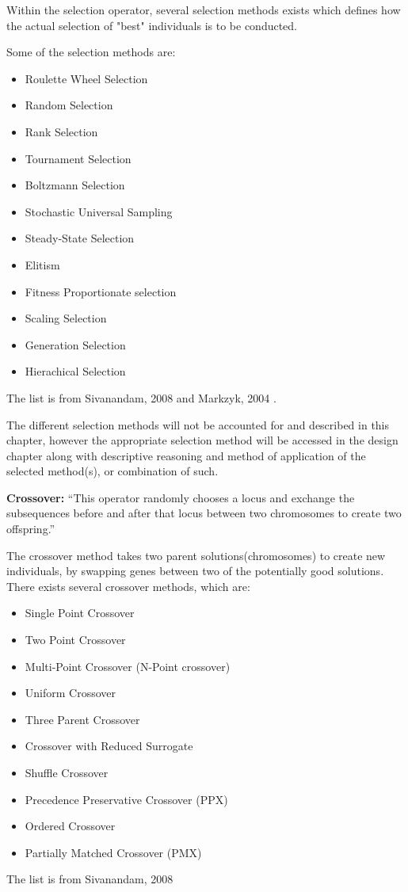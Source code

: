 \begin{itemize}
Within the selection operator, several selection methods exists which defines how the actual selection of "best" individuals is to be conducted. 

Some of the selection methods are:
\begin{itemize}
\item Roulette Wheel Selection
\item Random Selection
\item Rank Selection
\item Tournament Selection
\item Boltzmann Selection
\item Stochastic Universal Sampling
\item Steady-State Selection
\item Elitism
\item Fitness Proportionate selection
\item Scaling Selection
\item Generation Selection
\item Hierachical Selection
\end{itemize}
The list is from Sivanandam, 2008 \cite[pp. 46-50]{Sivanandam2008} and Markzyk, 2004 \cite{Adam2004}.

The different selection methods will not be accounted for and described in this chapter, however the appropriate selection method will be accessed in the design chapter along with descriptive reasoning and method of application of the selected method(s), or combination of such.

\textbf{Crossover:} \enquote{This operator randomly chooses a locus and exchange the subsequences before and after that locus between two chromosomes to create two offspring.} \cite[pp. 8]{Melanie1990}

The crossover method takes two parent solutions(chromosomes) to create new individuals, by swapping genes between two of the potentially good solutions. There exists several crossover methods, which are:


\begin{itemize}
\item Single Point Crossover
\item Two Point Crossover
\item Multi-Point Crossover (N-Point crossover)
\item Uniform Crossover
\item Three Parent Crossover
\item Crossover with Reduced Surrogate
\item Shuffle Crossover
\item Precedence Preservative Crossover (PPX)
\item Ordered Crossover
\item Partially Matched Crossover (PMX)
\end{itemize}
The list is from Sivanandam, 2008 \cite[pp. 50-56]{Sivanandam2008}


\end{itemize}
